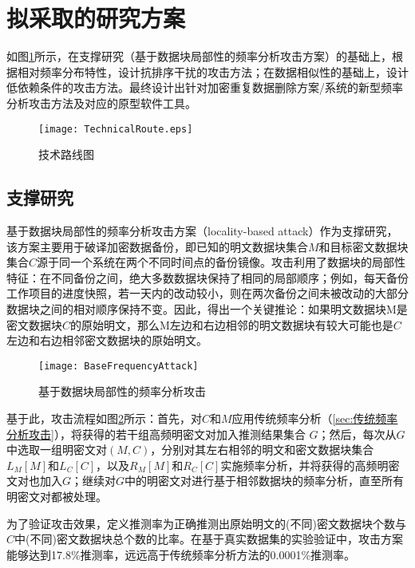 \section{拟采取的研究方案}
\label{sec:技术路线}



如图\ref{fig:技术路线图}所示，在支撑研究（基于数据块局部性的频率分析攻击方案）的基础上，根据相对频率分布特性，设计抗排序干扰的攻击方法；在数据相似性的基础上，设计低依赖条件的攻击方法。最终设计出针对加密重复数据删除方案/系统的新型频率分析攻击方法及对应的原型软件工具。

\begin{figure}[!htb]
    \small
    \centering
    \texttt{[image: TechnicalRoute.eps]}
    \caption{技术路线图} 
    \label{fig:技术路线图}
\end{figure}

\subsection{支撑研究}

基于数据块局部性的频率分析攻击方案（locality-based attack）作为支撑研究，该方案主要用于破译加密数据备份，即已知的明文数据块集合$M$和目标密文数据块集合$C$源于同一个系统在两个不同时间点的备份镜像。攻击利用了数据块的局部性特征：在不同备份之间，绝大多数数据块保持了相同的局部顺序；例如，每天备份工作项目的进度快照，若一天内的改动较小，则在两次备份之间未被改动的大部分数据块之间的相对顺序保持不变。因此，得出一个关键推论：如果明文数据块M是密文数据块$C$的原始明文，那么M左边和右边相邻的明文数据块有较大可能也是$C$左边和右边相邻密文数据块的原始明文。

\begin{figure}[!htb]
    \small
    \centering
    \texttt{[image: BaseFrequencyAttack]}
    \caption{基于数据块局部性的频率分析攻击} 
    \label{fig:基于数据块局部性的频率分析攻击}
\end{figure}


基于此，攻击流程如图\ref{fig:基于数据块局部性的频率分析攻击}所示：首先，对$C$和$M$应用传统频率分析（\cref{sec:传统频率分析攻击}），将获得的若干组高频明密文对加入推测结果集合 $G$；然后，每次从$G$中选取一组明密文对$(M,C)$，分别对其左右相邻的明文和密文数据块集合$L_M[M]$和$L_C[C]$，以及$R_M[M]$和$R_C[C]$实施频率分析，并将获得的高频明密文对也加入$G$；继续对$G$中的明密文对进行基于相邻数据块的频率分析，直至所有明密文对都被处理。

为了验证攻击效果，定义推测率为正确推测出原始明文的(不同)密文数据块个数与$C$中(不同)密文数据块总个数的比率。在基于真实数据集的实验验证中，攻击方案能够达到17.8\%推测率，远远高于传统频率分析方法的0.0001\%推测率。


